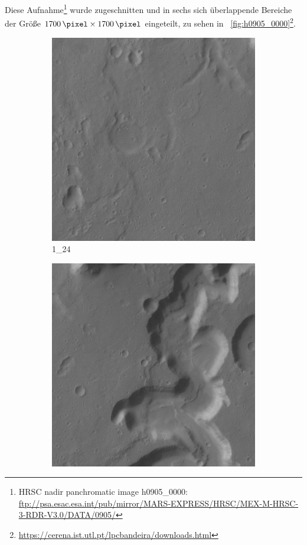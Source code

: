Diese Aufnahme\footnote{HRSC nadir panchromatic image h0905\_0000: \url{ftp://psa.esac.esa.int/pub/mirror/MARS-EXPRESS/HRSC/MEX-M-HRSC-3-RDR-V3.0/DATA/0905/}} wurde zugeschnitten und in sechs sich überlappende Bereiche der Größe $\SI{1700}{\pixel}\times\SI{1700}{\pixel}$ eingeteilt, zu sehen in \figurename~\ref{fig:h0905_0000}\footnote{\url{https://cerena.ist.utl.pt/lpcbandeira/downloads.html}}.
\begin{figure}[H]
	\centering
	\begin{subfigure}{0.3\textwidth}
		\centering
		\includegraphics[width=\textwidth,keepaspectratio]{images/h0905_0000/1_24.jpg}
		\caption{1\_24}
	\end{subfigure}
	\begin{subfigure}{0.3\textwidth}
		\centering
		\includegraphics[width=\textwidth,keepaspectratio]{images/h0905_0000/2_24.jpg}

\end{subfigure}
\end{figure}
